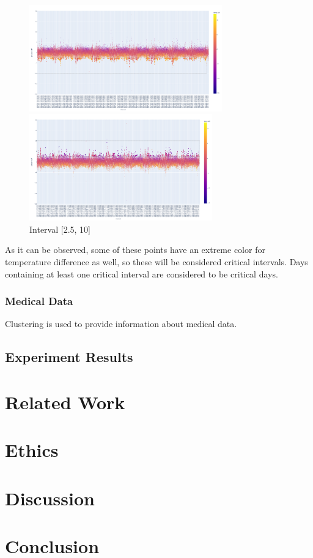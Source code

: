 \documentclass{article}
\begin{document}
\begin{figure}[h!] 
\begin{multicols}{2}

\centering
\includegraphics[height=4.6cm]{newplot (3).png}
\caption{Interval [-10, -2.5]}
\label{interval1}

\centering
\includegraphics[height=4.6cm]{newplot (2).png}
\caption{Interval [2.5, 10]}
\label{interval2}

\end{multicols}
\end{figure}
\newpage

As it can be observed, some of these points have an extreme color for temperature difference as well, so these will be considered critical intervals. Days containing at least one critical interval are considered to be critical days.

\subsubsection{Medical Data}

Clustering is used to provide information about medical data.  

\subsection{Experiment Results}


\section{Related Work}

\newpage
\section{Ethics}
\section{Discussion}
\section{Conclusion}
\newpage

\nocite{*}
\medskip
\begin{multicols}{2}
\printbibliography[heading=bibintoc]
\end{multicols}
\end{document}
